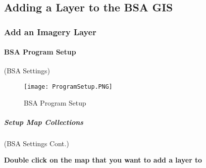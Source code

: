 \documentclass[class=article , crop=false, titlepage, twoside, multi={itemize, figure, verbatim}, float=false]{standalone}
\title{}  %
\begin{document}

\ifstandalone
\maketitle %
\clearpage
\fi

\subsection{Adding a Layer to the BSA GIS}

\subsubsection{Add an Imagery Layer}
\vspace{.25in}

%
%
\paragraph[BSA Program Setup ]{\Large BSA Program Setup\texorpdfstring{\\}{}}
(BSA Settings)
\vspace{.25in}

\vspace{.15in}

%
%
\begin{figure}[h!]
\centering
    \texttt{[image: ProgramSetup.PNG]}
\caption{BSA Program Setup}
\end{figure}
\clearpage
%
%
%
\subparagraph[Setup Map Collections]{\Large Setup Map Collections\texorpdfstring{\\}{}}
(BSA Settings Cont.)
\vspace{.5in}

\vspace{.5in}

\noindent \textbf{Double click on the map that you want to add a layer to}
\vspace{.5in}
\end{document}
